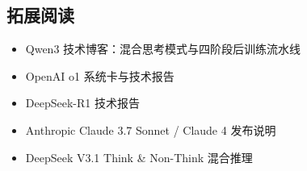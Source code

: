 \subsection{拓展阅读}

\begin{itemize}
    \item Qwen3 技术博客：混合思考模式与四阶段后训练流水线
    \item OpenAI o1 系统卡与技术报告
    \item DeepSeek-R1 技术报告
    \item Anthropic Claude 3.7 Sonnet / Claude 4 发布说明
    \item DeepSeek V3.1 Think \& Non-Think 混合推理
\end{itemize}



